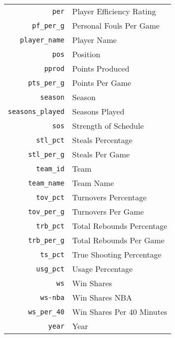 \begin{table}[H]
\begin{tabular}{rl}
    \texttt{per}                 & Player Efficiency Rating                                      \\
    \texttt{pf\_per\_g}          & Personal Fouls Per Game                                       \\
    \texttt{player\_name}        & Player Name                                                   \\
    \texttt{pos}                 & Position                                                      \\
    \texttt{pprod}               & Points Produced                                               \\
    \texttt{pts\_per\_g}         & Points Per Game                                               \\
    \texttt{season}              & Season                                                        \\
    \texttt{seasons\_played}     & Seasons Played                                                \\
    \texttt{sos}                 & Strength of Schedule                                          \\
    \texttt{stl\_pct}            & Steals Percentage                                             \\
    \texttt{stl\_per\_g}         & Steals Per Game                                               \\
    \texttt{team\_id}            & Team                                                          \\
    \texttt{team\_name}          & Team Name                                                     \\
    \texttt{tov\_pct}            & Turnovers Percentage                                          \\
    \texttt{tov\_per\_g}         & Turnovers Per Game                                            \\
    \texttt{trb\_pct}            & Total Rebounds Percentage                                     \\
    \texttt{trb\_per\_g}         & Total Rebounds Per Game                                       \\
    \texttt{ts\_pct}             & True Shooting Percentage                                      \\
    \texttt{usg\_pct}            & Usage Percentage                                              \\
    \texttt{ws}                  & Win Shares                                                    \\
    \texttt{ws-nba}              & Win Shares NBA                                                \\
    \texttt{ws\_per\_40}         & Win Shares Per 40 Minutes                                     \\
    \texttt{year}                & Year                                                          \\
  \bottomrule
\end{tabular}
\end{table}
